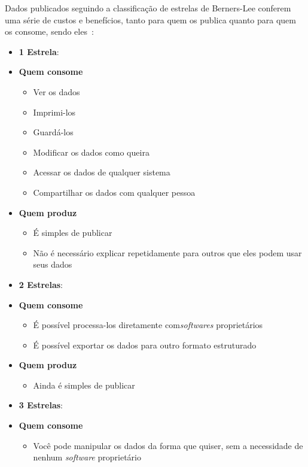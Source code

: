 Dados publicados seguindo a classificação de estrelas de Berners-Lee conferem uma série de custos e benefícios, tanto para quem os publica quanto para quem os consome, sendo eles~\cite{seijiconectados}:
\begin{itemize} 
\item \textbf{1 Estrela}: 
	\item[] \textbf{Quem consome}
		\begin{itemize}
			\itemsep0em
			\item Ver os dados
			\item Imprimi-los
			\item Guardá-los
			\item Modificar os dados como queira
			\item Acessar os dados de qualquer sistema
			\item Compartilhar os dados com qualquer pessoa			
		\end{itemize}
		
	\item[] \textbf{Quem produz}
		\begin{itemize}
			\itemsep0em
			\item É simples de publicar
			\item Não é necessário explicar repetidamente para outros que eles podem usar seus dados
		\end{itemize}
		
\item \textbf{2 Estrelas}:

	\item[] \textbf{Quem consome}
		\begin{itemize}
			\itemsep0em
			\item É possível processa-los diretamente com\emph{softwares} proprietários 
			\item É possível exportar os dados para outro formato estruturado
		\end{itemize}
		
	\item[] \textbf{Quem produz}
		\begin{itemize}
			\itemsep0em
			\item Ainda é simples de publicar
		\end{itemize}

\item \textbf{3 Estrelas}:
	\item[] \textbf{Quem consome}
		\begin{itemize}
			\itemsep0em
			\item Você pode manipular os dados da forma que quiser, sem a necessidade de nenhum \emph{software} proprietário	
		\end{itemize}
		

\end{itemize}
